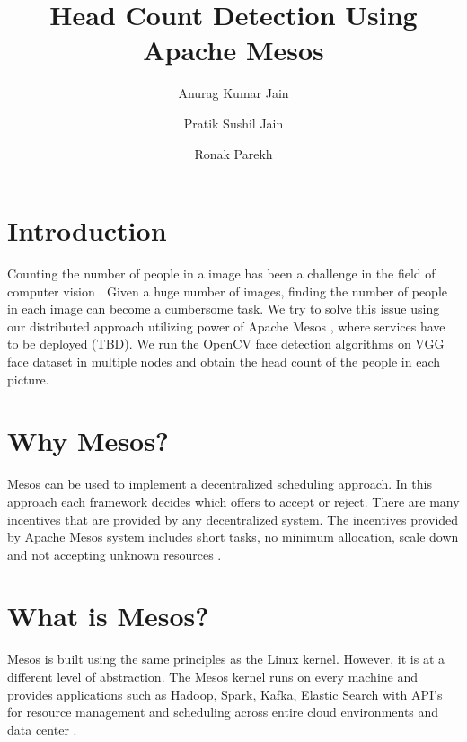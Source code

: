 \documentclass[9pt,twocolumn,twoside]{../../styles/osajnl}
\title{Head Count Detection Using Apache Mesos}
\author[1, *]{Anurag Kumar Jain}
\author[2]{Pratik Sushil Jain}
\author[3]{Ronak Parekh}
\affil[1]{School of Informatics and Computing, Bloomington, IN 47408, U.S.A.}
\affil[*]{Corresponding authors: jainanur@iu.edu}
\begin{document}
\maketitle

\section{Introduction}

Counting the number of people in a image has been a challenge in the
field of computer vision \cite{www-face-detection-wikipedia}. Given a
huge number of images, finding the number of people in each image can
become a cumbersome task. We try to solve this issue using our
distributed approach utilizing power of Apache Mesos \cite{www-mesos},
where services have to be deployed (TBD). We run the OpenCV
\cite{www-opencv-wikipedia} face detection algorithms on VGG face
dataset in multiple nodes and obtain the head count of the people in
each picture.

\section{Why Mesos?}
Mesos can be used to implement a decentralized scheduling approach. In
this approach each framework decides which offers to accept or
reject. There are many incentives that are provided by any
decentralized system. The incentives provided by Apache Mesos system
includes short tasks, no minimum allocation, scale down and not
accepting unknown resources \cite{www-mesos-paper}.

\section{What is Mesos?}
Mesos is built using the same principles as the Linux kernel. However,
it is at a different level of abstraction. The Mesos kernel runs on
every machine and provides applications such as Hadoop, Spark, Kafka,
Elastic Search with API's for resource management and scheduling
across entire cloud environments and data center \cite{www-mesos-paper}.
\end{document}

